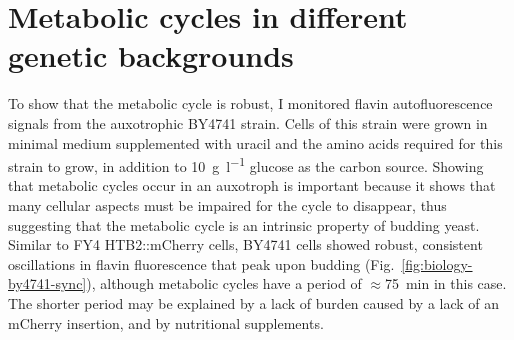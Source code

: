 \section{Metabolic cycles in different genetic backgrounds}
\label{sec:biology-backgrounds}

To show that the metabolic cycle is robust,
I monitored flavin autofluorescence signals from the auxotrophic BY4741 strain.
Cells of this strain were grown in minimal medium supplemented with uracil and the amino acids required for this strain to grow, in addition to \SI{10}{\gram~\litre^{-1}} glucose as the carbon source.
Showing that metabolic cycles occur in an auxotroph is important because it shows that many cellular aspects must be impaired for the cycle to disappear, thus suggesting that the metabolic cycle is an intrinsic property of budding yeast.
Similar to FY4 HTB2::mCherry cells, BY4741 cells showed robust, consistent oscillations in flavin fluorescence that peak upon budding (Fig.\ \ref{fig:biology-by4741-sync}), although metabolic cycles have a period of $\approx$\SI{75}{\minute} in this case.
The shorter period may be explained by a lack of burden caused by a lack of an mCherry insertion, and by nutritional supplements.

